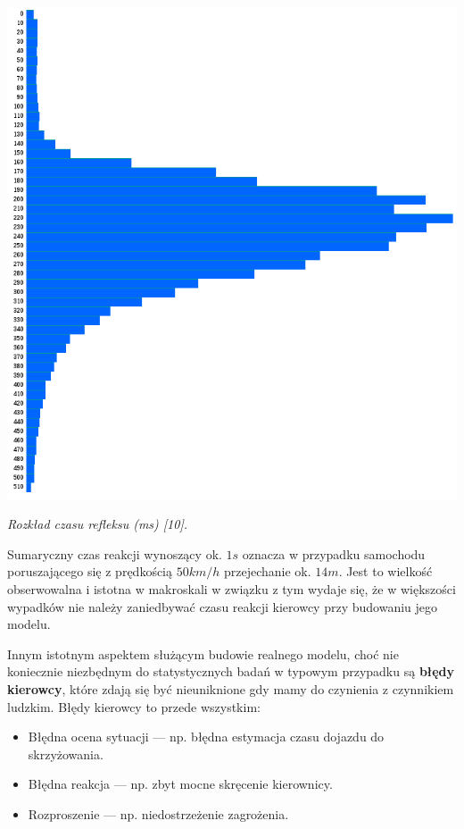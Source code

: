 {{{\begin{center}
\includegraphics[]{img/reaction_times}
\end{center}
}
\par{
\begin{center}
\textit{Rozkład czasu refleksu (ms) [10].}
\end{center}
}
\par{
Sumaryczny czas reakcji wynoszący ok. $1s$ oznacza w przypadku samochodu poruszającego się z prędkością $50km/h$ przejechanie ok. $14m$. Jest to wielkość obserwowalna i istotna w makroskali w związku z tym wydaje się, że w większości wypadków nie należy zaniedbywać czasu reakcji kierowcy przy budowaniu jego modelu.
}
\par{
Innym istotnym aspektem służącym budowie realnego modelu, choć nie koniecznie niezbędnym do statystycznych badań w typowym przypadku są \textbf{błędy kierowcy}, które zdają się być nieuniknione gdy mamy do czynienia z czynnikiem ludzkim. Błędy kierowcy to przede wszystkim:
\begin{itemize}
\item Błędna ocena sytuacji --- np. błędna estymacja czasu dojazdu do skrzyżowania.
\item Błędna reakcja --- np. zbyt mocne skręcenie kierownicy.
\item Rozproszenie --- np. niedostrzeżenie zagrożenia.

\end{itemize}}}}
